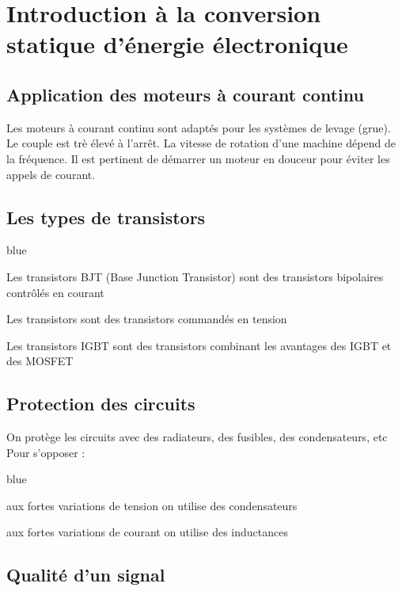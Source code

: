 
\chapter{Introduction à la conversion statique d'énergie électronique}

\section{Application des moteurs à courant continu}

Les moteurs à courant continu sont adaptés pour les systèmes de levage (grue). Le couple est trè élevé à l'arrêt.
La vitesse de rotation d'une machine dépend de la fréquence.
Il est pertinent de démarrer un moteur en douceur pour éviter les appels de courant.
\section{Les types de transistors}

\begin{items}{blue}{\Triangle}
    \item Les transistors BJT (Base Junction Transistor) sont des transistors bipolaires contrôlés en courant
    \item Les transistors  sont des transistors commandés en tension
    \item Les transistors IGBT sont des transistors combinant les avantages des  IGBT et des MOSFET
\end{items}

\section{Protection des circuits}


On protège les circuits avec des radiateurs, des fusibles, des condensateurs, etc\\
Pour s'opposer : 
\begin{items}{blue}{\Triangle}
    \item aux fortes variations de tension on utilise des condensateurs
    \item aux fortes variations de courant on utilise des inductances
\end{items}

\section{Qualité d'un signal}

